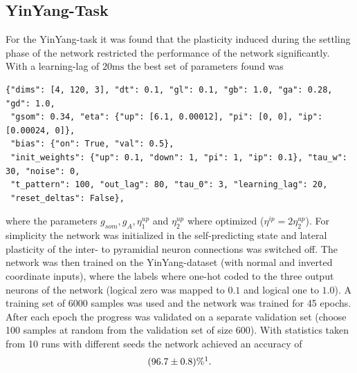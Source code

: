 \documentclass[12pt,a4paper]{article}
\begin{document}
\subsection{YinYang-Task}
For the YinYang-task it was found that the plasticity induced during the settling phase of the network restricted the performance of the network significantly. With a learning-lag of $20\text{ms}$ the best set of parameters found was 
\begin{verbatim}
{"dims": [4, 120, 3], "dt": 0.1, "gl": 0.1, "gb": 1.0, "ga": 0.28, "gd": 1.0,
 "gsom": 0.34, "eta": {"up": [6.1, 0.00012], "pi": [0, 0], "ip": [0.00024, 0]},
 "bias": {"on": True, "val": 0.5},
 "init_weights": {"up": 0.1, "down": 1, "pi": 1, "ip": 0.1}, "tau_w": 30, "noise": 0,
 "t_pattern": 100, "out_lag": 80, "tau_0": 3, "learning_lag": 20,
 "reset_deltas": False},
\end{verbatim}
where the parameters $g_{som}, g_A, \eta^{up}_1$ and $\eta^{up}_{2}$ where optimized ($\eta^{ip} = 2\eta^{up}_2$). For simplicity the network was initialized in the self-predicting state and lateral plasticity of the inter- to pyramidial neuron connections was switched off. The network was then trained on the YinYang-dataset (with normal and inverted coordinate inputs), where the labels where one-hot coded to the three output neurons of the network (logical zero was mapped to $0.1$ and logical one to $1.0$). A training set of 6000 samples was used and the network was trained for 45 epochs. After each epoch the progress was validated on a separate validation set (choose 100 samples at random from the validation set of size 600). With statistics taken from 10 runs with different seeds the network achieved an accuracy of
\begin{align*}
(96.7 \pm 0.8)\% \protect\footnotemark.
\end{align*}
\end{document}
